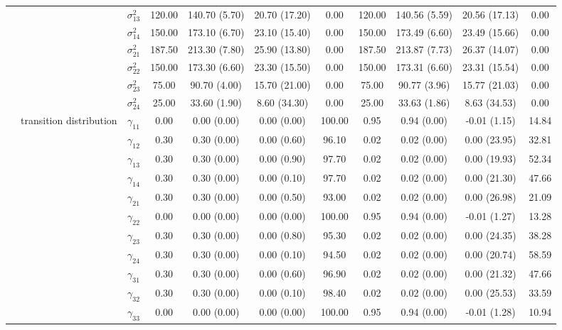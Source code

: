 \begin{table}[h]
{\begin{tabular}{ccccccccccc}
 &  & $\sigma^2_{13}$ & 120.00 & 140.70 (5.70) & 20.70 (17.20) & 0.00 & 120.00 & 140.56 (5.59) & 20.56 (17.13) & 0.00 \\
 &  & $\sigma^2_{14}$ & 150.00 & 173.10 (6.70) & 23.10 (15.40) & 0.00 & 150.00 & 173.49 (6.60) & 23.49 (15.66) & 0.00 \\
 &  & $\sigma^2_{21}$ & 187.50 & 213.30 (7.80) & 25.90 (13.80) & 0.00 & 187.50 & 213.87 (7.73) & 26.37 (14.07) & 0.00 \\
 &  & $\sigma^2_{22}$ & 150.00 & 173.30 (6.60) & 23.30 (15.50) & 0.00 & 150.00 & 173.31 (6.60) & 23.31 (15.54) & 0.00 \\
 &  & $\sigma^2_{23}$ & 75.00 & 90.70 (4.00) & 15.70 (21.00) & 0.00 & 75.00 & 90.77 (3.96) & 15.77 (21.03) & 0.00 \\
 &  & $\sigma^2_{24}$ & 25.00 & 33.60 (1.90) & 8.60 (34.30) & 0.00 & 25.00 & 33.63 (1.86) & 8.63 (34.53) & 0.00 \\
 & \multirow{16}{*}{transition distribution} & $\gamma_{11}$ & 0.00 & 0.00 (0.00) & 0.00 (0.00) & 100.00 & 0.95 & 0.94 (0.00) & -0.01 (1.15) & 14.84 \\
 &  & $\gamma_{12}$ & 0.30 & 0.30 (0.00) & 0.00 (0.60) & 96.10 & 0.02 & 0.02 (0.00) & 0.00 (23.95) & 32.81 \\
 &  & $\gamma_{13}$ & 0.30 & 0.30 (0.00) & 0.00 (0.90) & 97.70 & 0.02 & 0.02 (0.00) & 0.00 (19.93) & 52.34 \\
 &  & $\gamma_{14}$ & 0.30 & 0.30 (0.00) & 0.00 (0.10) & 97.70 & 0.02 & 0.02 (0.00) & 0.00 (21.30) & 47.66 \\
 &  & $\gamma_{21}$ & 0.30 & 0.30 (0.00) & 0.00 (0.50) & 93.00 & 0.02 & 0.02 (0.00) & 0.00 (26.98) & 21.09 \\
 &  & $\gamma_{22}$ & 0.00 & 0.00 (0.00) & 0.00 (0.00) & 100.00 & 0.95 & 0.94 (0.00) & -0.01 (1.27) & 13.28 \\
 &  & $\gamma_{23}$ & 0.30 & 0.30 (0.00) & 0.00 (0.80) & 95.30 & 0.02 & 0.02 (0.00) & 0.00 (24.35) & 38.28 \\
 &  & $\gamma_{24}$ & 0.30 & 0.30 (0.00) & 0.00 (0.10) & 94.50 & 0.02 & 0.02 (0.00) & 0.00 (20.74) & 58.59 \\
 &  & $\gamma_{31}$ & 0.30 & 0.30 (0.00) & 0.00 (0.60) & 96.90 & 0.02 & 0.02 (0.00) & 0.00 (21.32) & 47.66 \\
 &  & $\gamma_{32}$ & 0.30 & 0.30 (0.00) & 0.00 (0.10) & 98.40 & 0.02 & 0.02 (0.00) & 0.00 (25.53) & 33.59 \\
 &  & $\gamma_{33}$ & 0.00 & 0.00 (0.00) & 0.00 (0.00) & 100.00 & 0.95 & 0.94 (0.00) & -0.01 (1.28) & 10.94 \\

\end{tabular}}
\end{table}

